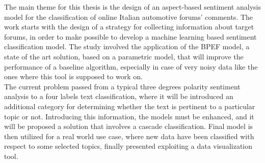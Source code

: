 
The main theme for this thesis is the design of an aspect-based sentiment analysis model for the classification of online Italian automotive forums' comments. The work starts with the design of a strategy for collecting information about target forums, in order to make possible to develop a machine learning based sentiment classification model. The study involved the application of the BPEF model, a state of the art solution, based on a parametric model, that will improve the performance of a baseline algorithm, especially in case of very noisy data like the ones where this tool is supposed to work on.\\
The current problem passed from a typical three degrees polarity sentiment analysis to a four labels text classification, where it will be introduced an additional category for determining whether the text is pertinent to a particular topic or not. Introducing this information, the models must be enhanced, and it will be proposed a solution that involves a cascade classification. Final model is then utilized for a real world use case, where new data have been classified with respect to some selected topics, finally presented exploiting a data visualization tool.